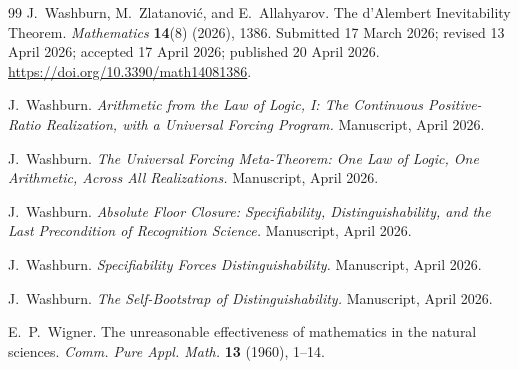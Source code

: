 \documentclass[11pt,a4paper]{article}
\theoremstyle{definition}
\theoremstyle{remark}
\begin{document}
\begin{thebibliography}{99}
J.~Washburn, M.~Zlatanovi\'c, and E.~Allahyarov.
The d'Alembert Inevitability Theorem.
\textit{Mathematics} \textbf{14}(8) (2026), 1386.
Submitted 17 March 2026; revised 13 April 2026; accepted 17 April 2026;
published 20 April 2026.
\url{https://doi.org/10.3390/math14081386}.

J.~Washburn.
\textit{Arithmetic from the Law of Logic, I:
The Continuous Positive-Ratio Realization,
with a Universal Forcing Program.}
Manuscript, April 2026.

J.~Washburn.
\textit{The Universal Forcing Meta-Theorem:
One Law of Logic, One Arithmetic, Across All Realizations.}
Manuscript, April 2026.

J.~Washburn.
\textit{Absolute Floor Closure: Specifiability, Distinguishability, and
the Last Precondition of Recognition Science.}
Manuscript, April 2026.

J.~Washburn.
\textit{Specifiability Forces Distinguishability.}
Manuscript, April 2026.

J.~Washburn.
\textit{The Self-Bootstrap of Distinguishability.}
Manuscript, April 2026.

E.~P.~Wigner.
The unreasonable effectiveness of mathematics in the natural sciences.
\textit{Comm. Pure Appl. Math.} \textbf{13} (1960), 1--14.

\end{thebibliography}
\end{document}
